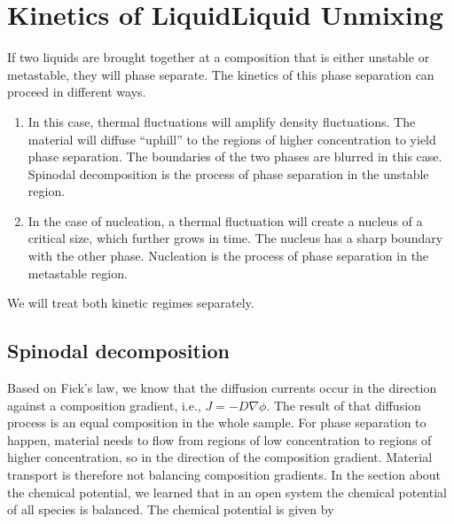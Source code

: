 \documentclass[letterpaper,10pt,english]{sphinxmanual}
\begin{document}
\chapter{Kinetics of Liquid\textendash{}Liquid Unmixing}
\label{\detokenize{notebooks/L5/2_Kinetics_LL_Unmixing:Kinetics-of-Liquid_Liquid-Unmixing}}\label{\detokenize{notebooks/L5/2_Kinetics_LL_Unmixing::doc}}
\sphinxAtStartPar
If two liquids are brought together at a composition that is either unstable or metastable, they will phase separate. The kinetics of this phase separation can proceed in different ways.
\begin{enumerate}
%
\item {} 
\sphinxAtStartPar
{} \textendash{} In this case, thermal fluctuations will amplify density fluctuations. The material will diffuse “uphill” to the regions of higher concentration to yield phase separation. The boundaries of the two phases are blurred in this case. Spinodal decomposition is the process of phase separation in the unstable region.

\item {} 
\sphinxAtStartPar
{} \textendash{} In the case of nucleation, a thermal fluctuation will create a nucleus of a critical size, which further grows in time. The nucleus has a sharp boundary with the other phase. Nucleation is the process of phase separation in the metastable region.

\end{enumerate}

\sphinxAtStartPar
We will treat both kinetic regimes separately.


\section{Spinodal decomposition}
\label{\detokenize{notebooks/L5/2_Kinetics_LL_Unmixing:Spinodal-decomposition}}
\sphinxAtStartPar
Based on Fick’s law, we know that the diffusion currents occur in the direction against a composition gradient, i.e., \(J=-D∇\phi\). The result of that diffusion process is an equal composition in the whole sample. For phase separation to happen, material needs to flow from regions of low concentration to regions of higher concentration, so in the direction of the composition gradient. Material transport is therefore not balancing composition gradients. In the section about the chemical
potential, we learned that in an open system the chemical potential of all species is balanced. The chemical potential is given by
\end{document}
